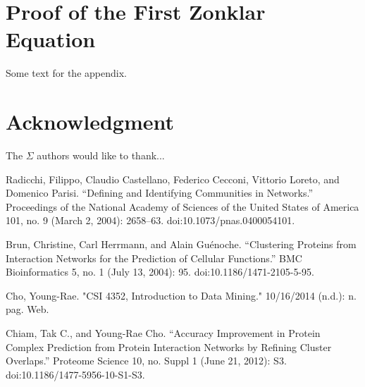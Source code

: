\documentclass[journal]{IEEEtran}
\begin{document}
\appendices
\section{Proof of the First Zonklar Equation}
Some text for the appendix.

\section*{Acknowledgment}


The $\Sigma$ authors would like to thank...


\ifCLASSOPTIONcaptionsoff
  \newpage
\fi





%
%
%
\begin{thebibliography}{1}
 
Radicchi, Filippo, Claudio Castellano, Federico Cecconi, Vittorio Loreto, and Domenico Parisi. “Defining and Identifying Communities in Networks.” Proceedings of the National Academy of Sciences of the United States of America 101, no. 9 (March 2, 2004): 2658–63. doi:10.1073/pnas.0400054101.

Brun, Christine, Carl Herrmann, and Alain Guénoche. “Clustering Proteins from Interaction Networks for the Prediction of Cellular Functions.” BMC Bioinformatics 5, no. 1 (July 13, 2004): 95. doi:10.1186/1471-2105-5-95.

 Cho, Young-Rae. "CSI 4352, Introduction to Data Mining." 10/16/2014 (n.d.): n. pag. Web.

 Chiam, Tak C., and Young-Rae Cho. “Accuracy Improvement in Protein Complex Prediction from Protein Interaction Networks by Refining Cluster Overlaps.” Proteome Science 10, no. Suppl 1 (June 21, 2012): S3. doi:10.1186/1477-5956-10-S1-S3.

\end{thebibliography}
\end{document}
